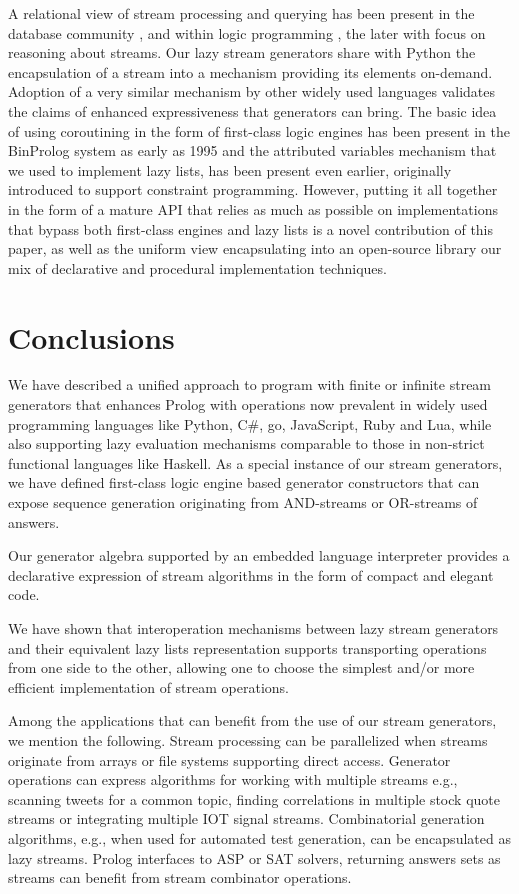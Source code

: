 \documentclass{new_tlp}
\begin{document}
A relational view of stream processing and querying has been 
present in the database community 
\cite{Law11,Babcock02},
and 
within logic programming 
\cite{Beck15}, %
the later with focus on
reasoning about streams.
Our lazy stream generators share with Python  \cite{pyref} the encapsulation of
a stream into a mechanism providing its elements on-demand. 
Adoption of a very similar mechanism by other widely
used languages validates the claims of 
enhanced expressiveness  that generators can bring.
The basic idea of using coroutining in the form of first-class logic engines
has been present in the BinProlog system  \cite{bp2011} as early as 1995 and
the attributed variables  mechanism \cite{holz92} that we used to implement 
lazy lists, has been present even earlier, originally introduced to support constraint programming. However, putting it all together
in the form of a mature API that relies as much as possible
 on implementations that bypass both first-class engines and lazy lists is a 
 novel contribution of this paper,
 as well as the uniform view  encapsulating into an open-source library 
 our mix of declarative and procedural implementation techniques. 
 
\section{Conclusions}\label{conc}

We have described a unified approach to program with finite or infinite stream generators
that enhances Prolog with operations now prevalent in widely used programming languages
like Python, C\#, go, JavaScript, Ruby and Lua, while also supporting lazy evaluation mechanisms comparable to those in non-strict functional languages like Haskell.
As a special instance of our stream generators,
we have defined first-class logic engine based generator constructors 
that can expose sequence  generation
originating from AND-streams or OR-streams of answers.

Our generator algebra supported by an embedded language interpreter provides
a declarative expression of stream algorithms in the form of compact and elegant code.

We have shown that interoperation mechanisms 
between lazy stream generators and their 
equivalent lazy lists representation
supports transporting operations from one side to the other,
allowing one to choose the simplest and/or more efficient
implementation of stream operations.

Among the applications that can benefit from the use of our stream generators, we mention the following.
Stream processing  can be parallelized when streams originate from  arrays or
file systems supporting  direct access.
Generator operations can express algorithms for working with multiple streams 
e.g., scanning tweets for a common topic,  finding correlations in multiple stock quote streams or integrating multiple IOT signal streams.
Combinatorial generation algorithms, e.g., when used for automated test generation, can be encapsulated as lazy streams.
Prolog interfaces to  ASP or SAT solvers, returning answers sets as streams can benefit from stream combinator operations.
\end{document}
